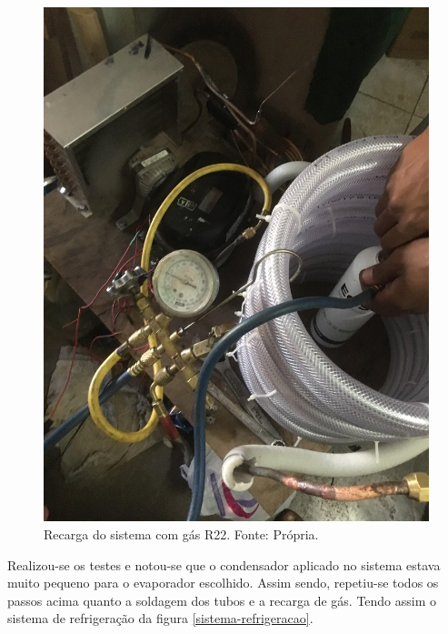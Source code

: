                 \begin{figure}[!htb]
                    \centering
                    \includegraphics[scale= 0.2]{figuras/recarga-gas.png}
                    \caption{Recarga do sistema com gás R22. Fonte: Própria.}
                    \label{recarga-gas}
                \end{figure}

                Realizou-se os testes e notou-se que o condensador aplicado no sistema estava
                muito pequeno para o evaporador escolhido. Assim sendo, repetiu-se todos os passos
                acima quanto a soldagem dos tubos e a recarga de gás. Tendo assim o sistema de
                refrigeração da figura \ref{sistema-refrigeracao}.

